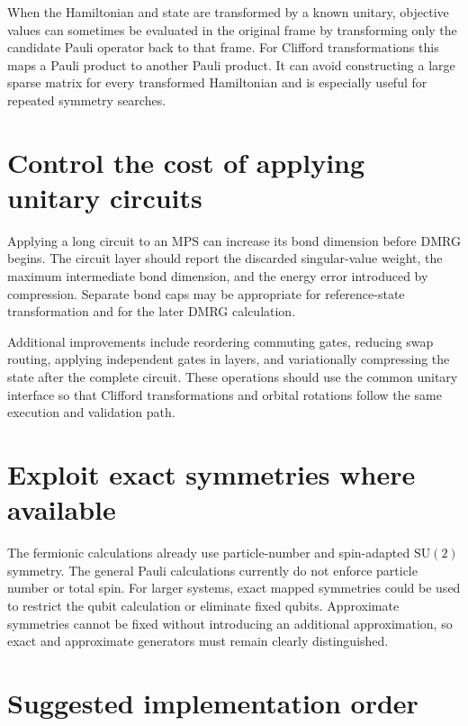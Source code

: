 \documentclass[11pt]{article}
\begin{document}
When the Hamiltonian and state are transformed by a known unitary, objective
values can sometimes be evaluated in the original frame by transforming only
the candidate Pauli operator back to that frame.  For Clifford transformations
this maps a Pauli product to another Pauli product.  It can avoid constructing
a large sparse matrix for every transformed Hamiltonian and is especially
useful for repeated symmetry searches.

\section{Control the cost of applying unitary circuits}

Applying a long circuit to an MPS can increase its bond dimension before DMRG
begins.  The circuit layer should report the discarded singular-value weight,
the maximum intermediate bond dimension, and the energy error introduced by
compression.  Separate bond caps may be appropriate for reference-state
transformation and for the later DMRG calculation.

Additional improvements include reordering commuting gates, reducing swap
routing, applying independent gates in layers, and variationally compressing
the state after the complete circuit.  These operations should use the common
unitary interface so that Clifford transformations and orbital rotations
follow the same execution and validation path.

\section{Exploit exact symmetries where available}

The fermionic calculations already use particle-number and spin-adapted
$\mathrm{SU}(2)$ symmetry.  The general Pauli calculations currently do not
enforce particle number or total spin.  For larger systems, exact mapped
symmetries could be used to restrict the qubit calculation or eliminate fixed
qubits.  Approximate symmetries cannot be fixed without introducing an
additional approximation, so exact and approximate generators must remain
clearly distinguished.

\section{Suggested implementation order}
\end{document}
